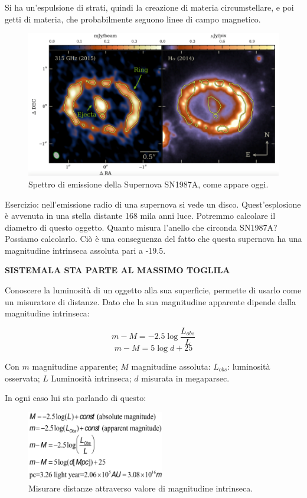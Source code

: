 Si ha un'espulsione di strati, quindi la creazione di materia circumstellare, e poi getti di materia, che probabilmente seguono linee di campo magnetico.

\begin{figure}[H]
    \centering
    \includegraphics[width=12cm]{discosupernova.png}
    \caption{Spettro di emissione della Supernova SN1987A, come appare oggi.}
    \label{discosupernova.png}
\end{figure}

Esercizio: nell'emissione radio di una supernova si vede un disco. Quest'esplosione è avvenuta in una stella distante 168 mila anni luce. Potremmo calcolare il diametro di questo oggetto. Quanto misura l'anello che circonda SN1987A? Possiamo calcolarlo. Ciò è una conseguenza del fatto che questa supernova ha una magnitudine intrinseca assoluta pari a -19.5.

\textbf{SISTEMALA STA PARTE AL MASSIMO TOGLILA}

Conoscere la luminosità di un oggetto alla sua superficie, permette di usarlo come un misuratore di distanze. Dato che la sua magnitudine apparente dipende dalla magnitudine intrinseca:

$$m-M=-2.5 \log \frac{L_{obs}}{L}$$
$$m - M = 5 \log d +25$$

Con $m$ magnitudine apparente; $M$ magnitudine assoluta: $L_{obs}$: luminosità osservata; $L$ Luminosità intrinseca; $d$ misurata in megaparsec.


In ogni caso lui sta parlando di questo:

\begin{figure}[H]
    \centering
    \includegraphics[width=6cm]{lezione 28 novembre/misuradistanze.png}
    \caption{Misurare distanze attraverso valore di magnitudine intrinseca.}
    \label{lezione 28 novembre/misuradistanze.png}
\end{figure}


